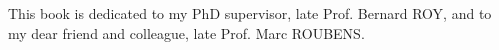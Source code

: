 
%
%
%

\begin{dedication}
This book is dedicated to my PhD supervisor, late Prof. Bernard ROY, and to my dear friend and colleague, late Prof. Marc ROUBENS.
\end{dedication}




